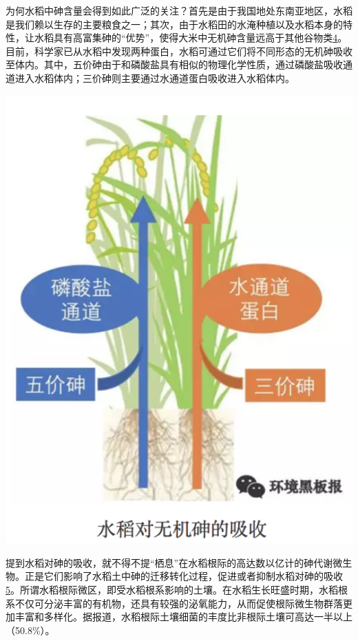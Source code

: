 \documentclass[
]{book}
\begin{document}
为何水稻中砷含量会得到如此广泛的关注？首先是由于我国地处东南亚地区，水稻是我们赖以生存的主要粮食之一；其次，由于水稻田的水淹种植以及水稻本身的特性，让水稻具有高富集砷的``优势''，使得大米中无机砷含量远高于其他谷物类\href{Khan\%20S,\%20Cai\%20Chao,\%20et\%20al．\%20Environ.\%20Sci.\%20\&\%20Technol.,\%202013,\%2047\%20:\%208624-8632．}{4}。目前，科学家已从水稻中发现两种蛋白，水稻可通过它们将不同形态的无机砷吸收至体内。其中，五价砷由于和磷酸盐具有相似的物理化学性质，通过磷酸盐吸收通道进入水稻体内；三价砷则主要通过水通道蛋白吸收进入水稻体内。

\includegraphics[width=6.44in]{images/as3}

提到水稻对砷的吸收，就不得不提``栖息''在水稻根际的高达数以亿计的砷代谢微生物。正是它们影响了水稻土中砷的迁移转化过程，促进或者抑制水稻对砷的吸收\href{Bi\%20H,\%20Huang\%20X,\%20et\%20al.\%20Small\%202014,\%2010,\%203544.}{5}。所谓水稻根际微区，即受水稻根系影响的土壤。在水稻生长旺盛时期，水稻根系不仅可分泌丰富的有机物，还具有较强的泌氧能力，从而促使根际微生物群落更加丰富和多样化。据报道，水稻根际土壤细菌的丰度比非根际土壤可高达一半以上（50.8\%）。
\end{document}
